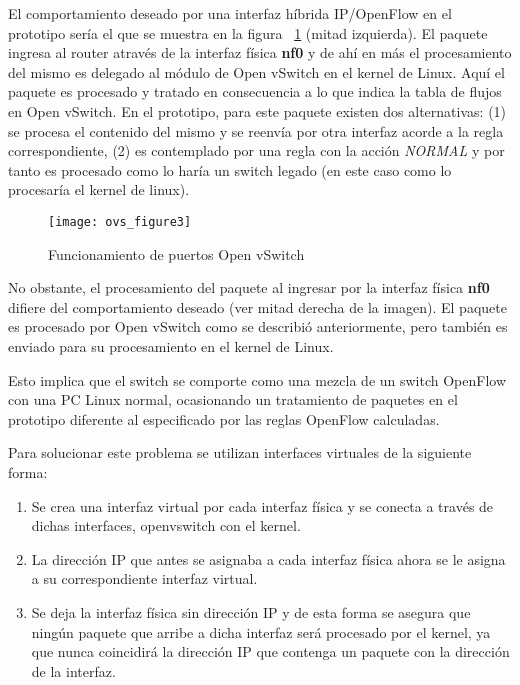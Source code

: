 \begin{enumerate}
El comportamiento deseado por una interfaz h\'ibrida IP/OpenFlow en el prototipo ser\'ia el que se muestra en la figura ~\ref{fig:OVSInterfaces} (mitad izquierda). El paquete ingresa al router atrav\'es de la interfaz f\'isica \textbf{nf0} y de ah\'i en m\'as el procesamiento del mismo es delegado al m\'odulo de Open vSwitch en el kernel de Linux. Aqu\'i el paquete es procesado y tratado en consecuencia a lo que indica la tabla de flujos en Open vSwitch. En el prototipo, para este paquete existen dos alternativas: (1) se procesa el contenido del mismo y se reenv\'ia por otra interfaz acorde a la regla correspondiente, (2) es contemplado por una regla con la acci\'on \textit{NORMAL} y por tanto es procesado como lo har\'ia un switch legado (en este caso como lo procesar\'ia el kernel de linux).

\begin{figure}[h!] 
\centering    
\texttt{[image: ovs\_figure3]}
\caption[Funcionamiento de puertos Open vSwitch]{Funcionamiento de puertos Open vSwitch}
\label{fig:OVSInterfaces}
\end{figure}

No obstante, el procesamiento del paquete al ingresar por la interfaz f\'isica \textbf{nf0} difiere del comportamiento deseado (ver mitad derecha de la imagen). El paquete es procesado por Open vSwitch como se describi\'o anteriormente, pero tambi\'en es enviado para su procesamiento en el kernel de Linux.

Esto implica que el switch se comporte como una mezcla de un switch OpenFlow  con una PC Linux normal, ocasionando un tratamiento de paquetes en el prototipo diferente al especificado por las reglas OpenFlow calculadas.

Para solucionar este problema se utilizan interfaces virtuales de la siguiente forma:

\begin{enumerate}
\item Se crea una interfaz virtual por cada interfaz física y se conecta a través de dichas interfaces,  openvswitch con el kernel.

\item La dirección IP que antes se asignaba a cada interfaz física ahora se le asigna a su correspondiente interfaz virtual.

\item Se deja la interfaz física sin dirección IP y de esta forma se asegura que ningún paquete que arribe a dicha interfaz será procesado por el kernel, ya que nunca coincidirá la dirección IP que contenga un paquete con la dirección de la interfaz.


\end{enumerate}
\end{enumerate}

